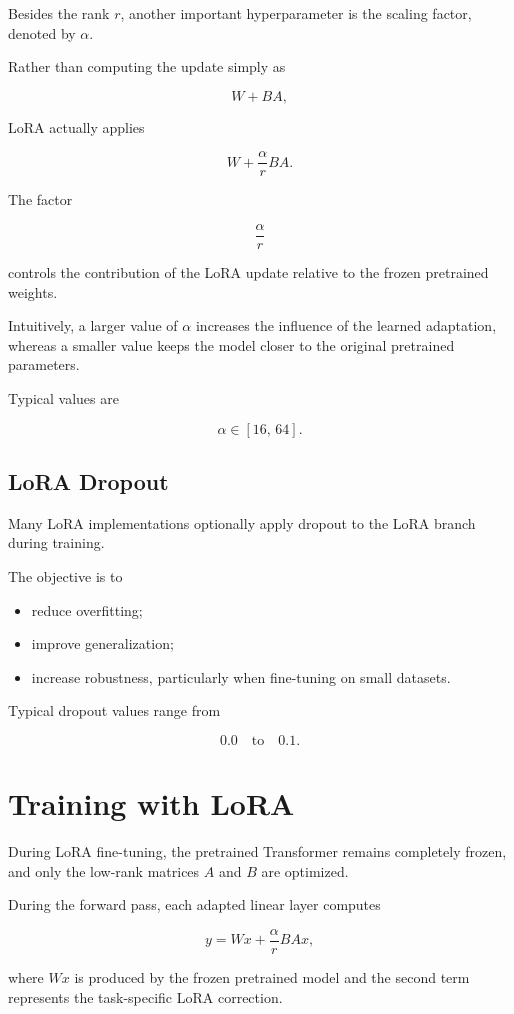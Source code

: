 Besides the rank $r$, another important hyperparameter is the scaling factor, denoted by $\alpha$.

Rather than computing the update simply as

\[
W + BA,
\]

LoRA actually applies

\[
W+\frac{\alpha}{r}BA.
\]

The factor

\[
\frac{\alpha}{r}
\]

controls the contribution of the LoRA update relative to the frozen pretrained weights.

Intuitively, a larger value of $\alpha$ increases the influence of the learned adaptation, whereas a smaller value keeps the model closer to the original pretrained parameters.

Typical values are

\[
\alpha \in [16,\,64].
\]
\subsection*{LoRA Dropout}

Many LoRA implementations optionally apply dropout to the LoRA branch during training.

The objective is to

\begin{itemize}
    \item reduce overfitting;
    \item improve generalization;
    \item increase robustness, particularly when fine-tuning on small datasets.
\end{itemize}

Typical dropout values range from

\[
0.0
\quad\text{to}\quad
0.1.
\]
\section{Training with LoRA}

During LoRA fine-tuning, the pretrained Transformer remains completely frozen, and only the low-rank matrices \(A\) and \(B\) are optimized.

During the forward pass, each adapted linear layer computes

\[
y
=
Wx
+
\frac{\alpha}{r}BAx,
\]

where \(Wx\) is produced by the frozen pretrained model and the second term represents the task-specific LoRA correction.

